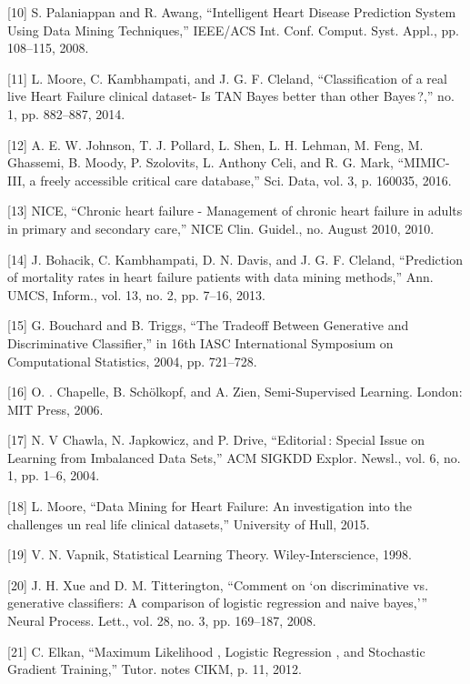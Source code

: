 \documentclass[a4paper,UKenglish]{oasics-v2016}
\begin{document}
[10]	S. Palaniappan and R. Awang, “Intelligent Heart Disease Prediction System Using Data Mining Techniques,” IEEE/ACS Int. Conf. Comput. Syst. Appl., pp. 108–115, 2008.

[11]	L. Moore, C. Kambhampati, and J. G. F. Cleland, “Classification of a real live Heart Failure clinical dataset- Is TAN Bayes better than other Bayes ?,” no. 1, pp. 882–887, 2014.

[12]	A. E. W. Johnson, T. J. Pollard, L. Shen, L. H. Lehman, M. Feng, M. Ghassemi, B. Moody, P. Szolovits, L. Anthony Celi, and R. G. Mark, “MIMIC-III, a freely accessible critical care database,” Sci. Data, vol. 3, p. 160035, 2016.

[13]	NICE, “Chronic heart failure - Management of chronic heart failure in adults in primary and secondary care,” NICE Clin. Guidel., no. August 2010, 2010.

[14]	J. Bohacik, C. Kambhampati, D. N. Davis, and J. G. F. Cleland, “Prediction of mortality rates in heart failure patients with data mining methods,” Ann. UMCS, Inform., vol. 13, no. 2, pp. 7–16, 2013.

[15]	G. Bouchard and B. Triggs, “The Tradeoff Between Generative and Discriminative Classifier,” in 16th IASC International Symposium on Computational Statistics, 2004, pp. 721–728.

[16]	O. . Chapelle, B. Schölkopf, and A. Zien, Semi-Supervised Learning. London: MIT Press, 2006.

[17]	N. V Chawla, N. Japkowicz, and P. Drive, “Editorial : Special Issue on Learning from Imbalanced Data Sets,” ACM SIGKDD Explor. Newsl., vol. 6, no. 1, pp. 1–6, 2004.

[18]	L. Moore, “Data Mining for Heart Failure: An investigation into the challenges un real life clinical datasets,” University of Hull, 2015.

[19]	V. N. Vapnik, Statistical Learning Theory. Wiley-Interscience, 1998.

[20]	J. H. Xue and D. M. Titterington, “Comment on ‘on discriminative vs. generative classifiers: A comparison of logistic regression and naive bayes,’” Neural Process. Lett., vol. 28, no. 3, pp. 169–187, 2008.

[21]	C. Elkan, “Maximum Likelihood , Logistic Regression , and Stochastic Gradient Training,” Tutor. notes CIKM, p. 11, 2012.
\end{document}
